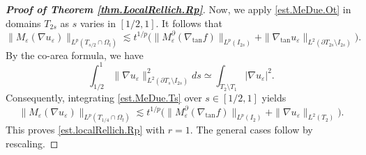 \documentclass[reqno,12pt]{amsart} %
\theoremstyle{definition}
\theoremstyle{remark}
\numberwithin{equation}{section}
\newcommand{\e}{\varepsilon}
\begin{document}
\begin{proof}[\textbf{Proof of Theorem \ref{thm.LocalRellich.Rp}}]
    Now, we apply \eqref{est.MeDue.Ot} in domains $T_{2s}$ as $s$ varies in $[1/2,1]$. It follows that
    \begin{equation}\label{est.MeDue.Ts}
        \| M_\e(\nabla u_\e) \|_{L^p(T_{s/2} \cap \Omega_t)} \lesssim t^{1/p} \big( \| M_\e^\partial(\nabla_{\tan} f) \|_{L^p(I_{2s})} + \| \nabla_{\tan} u_\e \|_{L^2(\partial T_{2s} \setminus I_{2s})} \big).
    \end{equation}
    By the co-area formula, we have
    \begin{equation}
        \int_{1/2}^1 \| \nabla u_\e \|_{L^2(\partial T_s \setminus I_{2s})}^2 ds \simeq \int_{T_2\setminus T_1} |\nabla u_\e|^2.
    \end{equation}
    Consequently, integrating \eqref{est.MeDue.Ts} over $s \in [1/2,1]$ yields
    \begin{equation}
        \| M_\e(\nabla u_\e) \|_{L^p(T_{1/4} \cap \Omega_t)} \lesssim t^{1/p} \big( \| M_\e^\partial(\nabla_{\tan} f) \|_{L^p(I_{2})} + \| \nabla u_\e \|_{L^2(T_{2} )} \big).
    \end{equation}
    This proves \eqref{est.localRellich.Rp} with $r = 1$. The general cases follow by rescaling.
    \end{proof}
\end{document}
